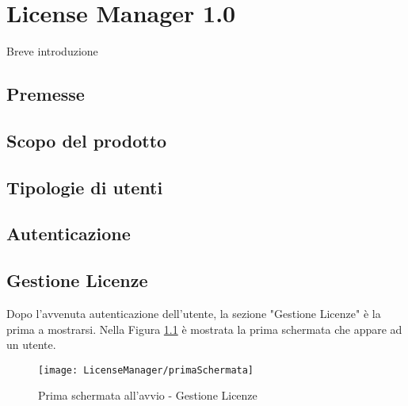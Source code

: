 
\chapter{License Manager 1.0}
\label{cap:license-manager}

Breve introduzione

\section{Premesse}



\section{Scopo del prodotto}


\section{Tipologie di utenti}


\section{Autenticazione}


\section{Gestione Licenze}
Dopo l'avvenuta autenticazione dell'utente, la sezione "Gestione Licenze" è la prima a mostrarsi. Nella Figura \ref{primscher} è mostrata la prima schermata che appare ad un utente.  

\begin{figure}[!h] 
    \centering 
    \texttt{[image: LicenseManager/primaSchermata]} 
    \caption{Prima schermata all'avvio - Gestione Licenze}
    \label{primscher}
\end{figure}

